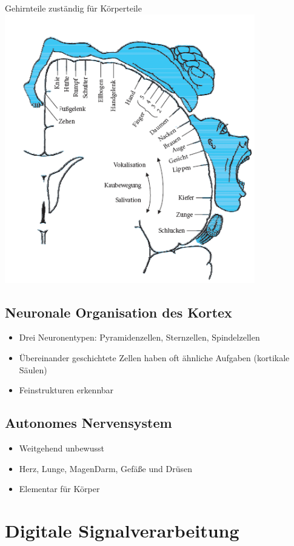 \documentclass[a4paper,10pt,oneside]{article}
\begin{document}
Gehirnteile zuständig für Körperteile
\includegraphics[scale=0.65]{Grafiken/Homunkulus.png}

\subsection{Neuronale Organisation des Kortex}
\begin{itemize}
	\item Drei Neuronentypen: Pyramidenzellen, Sternzellen, Spindelzellen
	\item Übereinander geschichtete Zellen haben oft ähnliche Aufgaben (kortikale Säulen)
	\item Feinstrukturen erkennbar
\end{itemize}

\subsection{Autonomes Nervensystem}
\begin{itemize}
	\item Weitgehend unbewusst
	\item Herz, Lunge, MagenDarm, Gefäße und Drüsen
	\item Elementar für Körper
\end{itemize}

\section{Digitale Signalverarbeitung}
\end{document}
